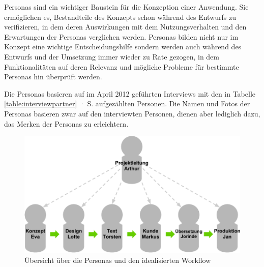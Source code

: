 Personas sind ein wichtiger Baustein für die Konzeption einer Anwendung. Sie ermöglichen es, Bestandteile des Konzepts schon während des Entwurfs zu verifizieren, in dem deren Auswirkungen mit dem Nutzungsverhalten und den Erwartungen der Personas verglichen werden. Personas bilden nicht nur im Konzept eine wichtige Entscheidungshilfe sondern werden auch während des Entwurfs und der Umsetzung immer wieder zu Rate gezogen, in dem Funktionalitäten auf deren Relevanz und mögliche Probleme für bestimmte Personas hin überprüft werden. \cite[S.38 ff.]{cohn2004user}

Die Personas basieren auf im April 2012 geführten Interviews mit den in Tabelle \ref{table:interviewpartner} · S.\pageref{table:interviewpartner} aufgezählten Personen. Die Namen und Fotos der Personas basieren zwar auf den interviewten Personen, dienen aber lediglich dazu, das Merken der Personas zu erleichtern.

\begin{figure}[htb]
\begin{center}
\includegraphics[width=\textwidth]{media/Uebersicht-Personas.pdf}
\caption{Übersicht über die Personas und den idealisierten Workflow}
\label{chart:uebersicht-personas}
\end{center}
\end{figure}


